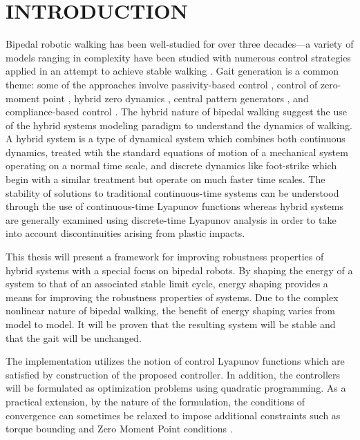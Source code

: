 \chapter*{\uppercase{Introduction}}

Bipedal robotic walking has been well-studied for over three decades---a variety of models ranging in complexity have been studied with numerous control strategies applied in an attempt to achieve stable walking \cite{aut_2014_gcsa_01,Hurmuzlu20041647,WGCCM07}.
%
Gait generation is a common theme: some of the approaches involve passivity-based control \cite{CRTW05,SB05}, control of zero-moment point \cite{FAA10,KKKFHYH06,VB04}, hybrid zero dynamics \cite{CDG08,WGCCM07,WGK03}, central pattern generators \cite{RH02,TAT03}, and compliance-based control \cite{PDP97}.
%
The hybrid nature of bipedal walking suggest the use of the hybrid systems modeling paradigm to understand the dynamics of walking.
%
A hybrid system is a type of dynamical system which combines both continuous dynamics, treated wtih the standard equations of motion of a mechanical system operating on a normal time scale, and discrete dynamics like foot-strike which begin with a similar treatment but operate on much faster time scales.
%
The stability of solutions to traditional continuous-time systems can be understood through the use of continuous-time Lyapunov functions whereas hybrid systems are generally examined using discrete-time Lyapunov analysis in order to take into account discontinuities arising from plastic impacts.

This thesis will present a framework for improving robustness properties of hybrid systems with a special focus on bipedal robots.
%
By shaping the energy of a system to that of an associated stable limit cycle, energy shaping provides a means for improving the robustness properties of systems.
%
Due to the complex nonlinear nature of bipedal walking, the benefit of energy shaping varies from model to model.
%
It will be proven that the resulting system will be stable and that the gait will be unchanged.

The implementation utilizes the notion of control Lyapunov functions which are satisfied by construction of the proposed controller.
%
In addition, the controllers will be formulated as optimization problems using quadratic programming.
%
As a practical extension, by the nature of the formulation, the conditions of convergence can sometimes be relaxed to impose additional constraints such as torque bounding and Zero Moment Point conditions \cite{VB04}.

